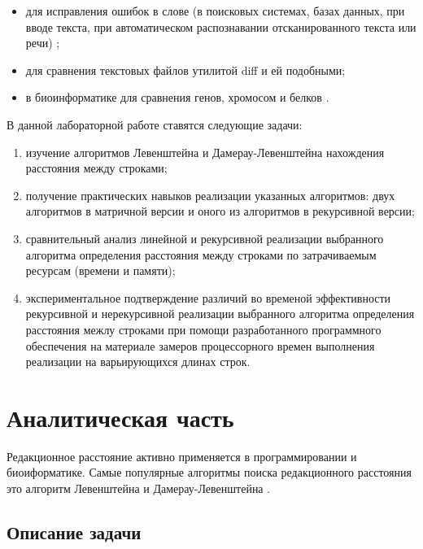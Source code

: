 \documentclass[a4paper,12pt]{article}
\begin{document}
\begin{itemize}
    \item для исправления ошибок в слове (в поисковых системах, базах
        данных, при вводе текста, при автоматическом распознавании
        отсканированного текста или речи) \cite{habr};

    \item для сравнения текстовых файлов утилитой diff и ей подобными;

    \item в биоинформатике для сравнения генов, хромосом и белков \cite{bio}.
\end{itemize}

В данной лабораторной работе ставятся следующие задачи:

\begin{enumerate}
    \item изучение алгоритмов Левенштейна и Дамерау-Левенштейна нахождения
        расстояния между строками;
    \item получение практических навыков реализации указанных алгоритмов:
        двух алгоритмов в матричной версии и оного из алгоритмов в рекурсивной
        версии;
    \item сравнительный анализ линейной и рекурсивной реализации выбранного
        алгоритма определения расстояния между строками по затрачиваемым
        ресурсам (времени и памяти);
    \item экспериментальное подтверждение различий во временой эффективности
        рекурсивной и нерекурсивной реализации выбранного алгоритма
        определения расстояния межлу строками при помощи разработанного
        программного обеспечения на материале замеров процессорного времен
        выполнения реализации на варьирующихся длинах строк.
\end{enumerate}

\newpage
\section{Аналитическая часть}

Редакционное расстояние активно применяется в программировании и биоиформатике.
Самые популярные алгоритмы поиска редакционного расстояния это алгоритм
Левенштейна и Дамерау-Левенштейна \cite{habr}.

\subsection{Описание задачи}
\end{document}
